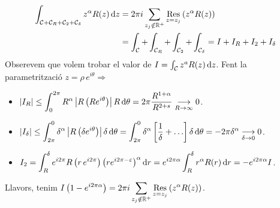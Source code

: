 \begin{sproof}
    \begin{align*}
    \begin{aligned}
        \int_{\mathcal{C} + \mathcal{C}_{R} + \mathcal{C}_{2} + \mathcal{C}_{\delta}} z^{\alpha}R(z) \mathop{}\!\mathrm{d} z &= 2\pi i \sum_{z_{j} \notin \mathbb{R}^{+}} \underset{z=z_{j}}{\operatorname{Res}} \left( z^{\alpha}R(z) \right) \\
        &= \int_{\mathcal{C}} + \int_{\mathcal{C}_{R}} + \int_{\mathcal{C}_{2}} + \int_{\mathcal{C}_{\delta}} = I + I_{R} + I_{2} + I_{\delta}
    \end{aligned}
    \end{align*}
    Obserevem que volem trobar el valor de $I =\int_{\mathcal{C}} z^{a} R(z) \mathop{}\!\mathrm{d} z$. Fent la parametrització $z = \rho\,e^{i\theta} \Rightarrow$
    \begin{itemize}
        \item $\displaystyle \left| I_{R} \right| \leq \int_{0}^{2\pi} R^{\alpha} \left| R\left( R e^{i\theta} \right) \right| R \mathop{}\!\mathrm{d} \theta = 2\pi \frac{R^{1+\alpha}}{R^{2+s}} \underset{R \to \infty}{\longrightarrow} 0$.
        \item $\displaystyle \abs{I_{\delta}} \leq \int_{2\pi}^{0} \delta^{\alpha} \abs{R \lrpar{\delta e^{i\theta}}} \delta \diff \theta = \int_{2\pi}^{0} \delta^{\alpha} \lrbra{\frac{1}{\delta} + \dots} \delta \diff \theta = - 2\pi \delta^{\alpha} \underset{\delta \to 0}{\longrightarrow} 0$.
        \item $\displaystyle I_{2} = \int_{R}^{\delta} e^{i2\pi} R\left( r\,e^{i2\pi} \right) \left( r e^{i2\pi - \varepsilon} \right)^{\alpha} \mathop{}\!\mathrm{d} r = e^{i2\pi \alpha} \int_{R}^{\delta} r^{\alpha} R(r) \mathop{}\!\mathrm{d} r = -e^{i2\pi \alpha} I$.
    \end{itemize}
    Llavors, tenim $\displaystyle I \left( 1-e^{i2\pi \alpha} \right) = 2\pi i \sum_{z_{j} \notin \mathbb{R}^{+}} \underset{z=z_{j}}{\operatorname{Res}} \left( z^{\alpha}R(z) \right)$.
\end{sproof}
